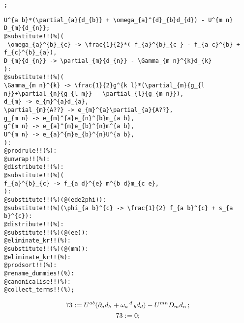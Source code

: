 \documentclass[11pt]{article}
\def\specialcolon{\mathrel{\mathop{:}}\hspace{-.5em}}
\begin{document}
{\color[named]{Blue}\begin{verbatim}
;
\end{verbatim}}
{\color[named]{Blue}\begin{verbatim}
U^{a b}*(\partial_{a}{d_{b}} + \omega_{a}^{d}_{b}d_{d}) - U^{m n} D_{m}{d_{n}};
@substitute!!(%)(
 \omega_{a}^{b}_{c} -> \frac{1}{2}*( f_{a}^{b}_{c } - f_{a c}^{b} + f_{c}^{b}_{a}),
D_{m}{d_{n}} -> \partial_{m}{d_{n}} - \Gamma_{m n}^{k}d_{k}
):
@substitute!!(%)(
\Gamma_{m n}^{k} -> \frac{1}{2}g^{k l}*(\partial_{m}{g_{l n}}+\partial_{n}{g_{l m}} - \partial_{l}{g_{m n}}),
d_{m} -> e_{m}^{a}d_{a},
\partial_{m}{A??} -> e_{m}^{a}\partial_{a}{A??},
g_{m n} -> e_{m}^{a}e_{n}^{b}m_{a b},
g^{m n} -> e_{a}^{m}e_{b}^{n}m^{a b},
U^{m n} -> e_{a}^{m}e_{b}^{n}U^{a b},
):
@prodrule!!(%):
@unwrap!!(%):
@distribute!!(%):
@substitute!!(%)(
f_{a}^{b}_{c} -> f_{a d}^{e} m^{b d}m_{c e},
):
@substitute!!(%)(@(ede2phi)):
@substitute!!(%)(\phi_{a b}^{c} -> \frac{1}{2} f_{a b}^{c} + s_{a b}^{c}):
@distribute!!(%):
@substitute!!(%)(@(ee)):
@eliminate_kr!!(%):
@substitute!!(%)(@(mm)):
@eliminate_kr!!(%):
@prodsort!!(%):
@rename_dummies!(%):
@canonicalise!!(%):
@collect_terms!!(%);
\end{verbatim}}
\begin{dmath*}[compact, spread=2pt]
73\specialcolon{}= {U}^{a b} ({\partial}_{a}{{d}_{b}}\,  + {\omega}_{a}\,^{d}\,_{b} {d}_{d}) - {U}^{m n} {D}_{m}{{d}_{n}}\, ;
\end{dmath*}
\begin{dmath*}[compact, spread=2pt]
73\specialcolon{}= 0;
\end{dmath*}
\end{document}
